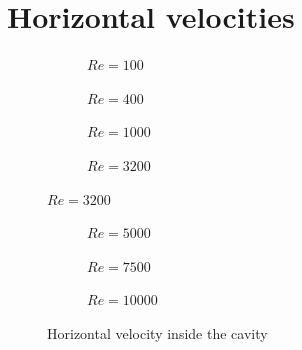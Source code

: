 \section{Horizontal velocities}
\begin{figure}[H]
	\centering
	\begin{subfigure}{0.5\textwidth}
		\resizebox{1.4\textwidth}{!}{}
		\caption{$Re=100$}
	\end{subfigure}%
	\begin{subfigure}{0.5\textwidth}
		\resizebox{1.4\textwidth}{!}{}
		\caption{$Re=400$}
	\end{subfigure}
	\begin{subfigure}{0.5\textwidth}
		\resizebox{1.4\textwidth}{!}{}
		\caption{$Re=1000$}
	\end{subfigure}%
	\begin{subfigure}{0.5\textwidth}
		\resizebox{1.4\textwidth}{!}{}
		\caption{$Re=3200$}
	\end{subfigure}
\end{figure}
\begin{figure}\ContinuedFloat
	\begin{subfigure}{0.5\textwidth}
		\resizebox{1.4\textwidth}{!}{}
		\caption{$Re=5000$}
	\end{subfigure}%
	\begin{subfigure}{0.5\textwidth}
		\resizebox{1.4\textwidth}{!}{}
		\caption{$Re=7500$}
	\end{subfigure}
	\begin{subfigure}{0.5\textwidth}
		\resizebox{1.4\textwidth}{!}{}
		\caption{$Re=10000$}
	\end{subfigure}
	\caption{Horizontal velocity inside the cavity}
\end{figure}

